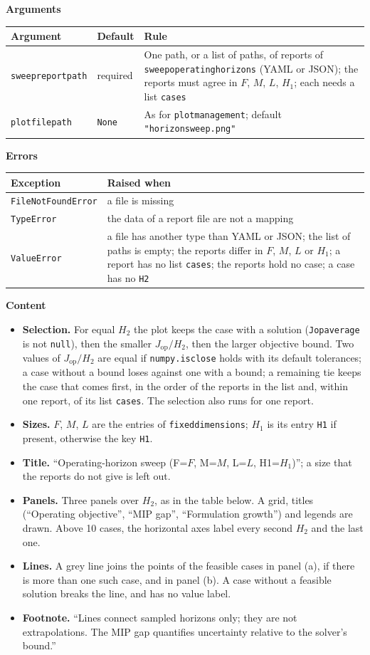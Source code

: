 \documentclass[11pt,a4paper]{article}
\makeatletter
\theoremstyle{plain}
\theoremstyle{definition}
\newcommand{\blockhead}[1]{\par\noindent\textbf{#1}\par\nobreak}
\renewcommand{\_}{\textunderscore\allowbreak{}}
\providecommand{\rejrow}[2]{{\raggedright #1\par} & {\raggedright #2\par} \\}
\providecommand{\typerow}[3]{{\raggedright #1\par} & {\raggedright #2\par} & {\raggedright #3\par} \\}
\providecommand{\tabstart}[2]{\begingroup\small\begin{longtable}{@{}#1@{}}\toprule #2 \\ \midrule \endhead}
\providecommand{\tabend}{\bottomrule\end{longtable}\endgroup}
\makeatother
\begin{document}
\blockhead{Arguments}
\tabstart{p{4.3cm}p{2.3cm}p{8.2cm}}{Argument & Default & Rule}
\typerow{\texttt{sweep\_report\_path}}{required}{One path, or a list of paths, of reports of \texttt{sweep\_operating\_horizons} (YAML or JSON); the reports must agree in $F$, $M$, $L$, $H_1$; each needs a list \texttt{cases}}
\typerow{\texttt{plot\_file\_path}}{\texttt{None}}{As for \texttt{plot\_management}; default \texttt{"horizon\_sweep.png"}}
\tabend

\blockhead{Errors}
\tabstart{p{3.4cm}p{11.6cm}}{Exception & Raised when}
\rejrow{\texttt{FileNotFoundError}}{a file is missing}
\rejrow{\texttt{TypeError}}{the data of a report file are not a mapping}
\rejrow{\texttt{ValueError}}{a file has another type than YAML or JSON; the list of paths is empty; the reports differ in $F$, $M$, $L$ or $H_1$; a report has no list \texttt{cases}; the reports hold no case; a case has no \texttt{H2}}
\tabend

\blockhead{Content}
\begin{itemize}[nosep]
  \item \textbf{Selection.} For equal $H_2$ the plot keeps the case with a solution (\texttt{J\_op\_average} is not \texttt{null}), then the smaller $J_{\mathrm{op}}/H_2$, then the larger objective bound. Two values of $J_{\mathrm{op}}/H_2$ are equal if \texttt{numpy.isclose} holds with its default tolerances; a case without a bound loses against one with a bound; a remaining tie keeps the case that comes first, in the order of the reports in the list and, within one report, of its list \texttt{cases}. The selection also runs for one report.
  \item \textbf{Sizes.} $F$, $M$, $L$ are the entries of \texttt{fixed\_dimensions}; $H_1$ is its entry \texttt{H1} if present, otherwise the key \texttt{H1}.
  \item \textbf{Title.} ``Operating-horizon sweep (F=$F$, M=$M$, L=$L$, H1=$H_1$)''; a size that the reports do not give is left out.
  \item \textbf{Panels.} Three panels over $H_2$, as in the table below. A grid, titles (``Operating objective'', ``MIP gap'', ``Formulation growth'') and legends are drawn. Above 10 cases, the horizontal axes label every second $H_2$ and the last one.
  \item \textbf{Lines.} A grey line joins the points of the feasible cases in panel (a), if there is more than one such case, and in panel (b). A case without a feasible solution breaks the line, and has no value label.
  \item \textbf{Footnote.} ``Lines connect sampled horizons only; they are not extrapolations. The MIP gap quantifies uncertainty relative to the solver's bound.''
\end{itemize}
\end{document}
